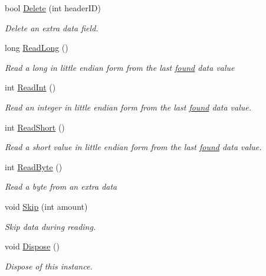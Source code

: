 \begin{DoxyCompactItemize}
bool \hyperlink{class_i_c_sharp_code_1_1_sharp_zip_lib_1_1_zip_1_1_zip_extra_data_a6726b4cecc913a3a09cea0b97e2edf7b}{Delete} (int header\+ID)
\begin{DoxyCompactList}\small\item\em Delete an extra data field. \end{DoxyCompactList}\item 
long \hyperlink{class_i_c_sharp_code_1_1_sharp_zip_lib_1_1_zip_1_1_zip_extra_data_a06f9836c2c567c9f223810d3e2d9b51c}{Read\+Long} ()
\begin{DoxyCompactList}\small\item\em Read a long in little endian form from the last \hyperlink{class_i_c_sharp_code_1_1_sharp_zip_lib_1_1_zip_1_1_zip_extra_data_a91e0c6c1d11967653256ccb161f9818c}{found} data value \end{DoxyCompactList}\item 
int \hyperlink{class_i_c_sharp_code_1_1_sharp_zip_lib_1_1_zip_1_1_zip_extra_data_a77039b5fe5d0c56be598b5eadb669a62}{Read\+Int} ()
\begin{DoxyCompactList}\small\item\em Read an integer in little endian form from the last \hyperlink{class_i_c_sharp_code_1_1_sharp_zip_lib_1_1_zip_1_1_zip_extra_data_a91e0c6c1d11967653256ccb161f9818c}{found} data value. \end{DoxyCompactList}\item 
int \hyperlink{class_i_c_sharp_code_1_1_sharp_zip_lib_1_1_zip_1_1_zip_extra_data_a13e4cefe2f4873f46fc93cc043852e57}{Read\+Short} ()
\begin{DoxyCompactList}\small\item\em Read a short value in little endian form from the last \hyperlink{class_i_c_sharp_code_1_1_sharp_zip_lib_1_1_zip_1_1_zip_extra_data_a91e0c6c1d11967653256ccb161f9818c}{found} data value. \end{DoxyCompactList}\item 
int \hyperlink{class_i_c_sharp_code_1_1_sharp_zip_lib_1_1_zip_1_1_zip_extra_data_ae4b31cc84f7085ace9656c3bff5bd3cc}{Read\+Byte} ()
\begin{DoxyCompactList}\small\item\em Read a byte from an extra data \end{DoxyCompactList}\item 
void \hyperlink{class_i_c_sharp_code_1_1_sharp_zip_lib_1_1_zip_1_1_zip_extra_data_afb83d24996e6234cdd6ed3b03785ec9c}{Skip} (int amount)
\begin{DoxyCompactList}\small\item\em Skip data during reading. \end{DoxyCompactList}\item 
void \hyperlink{class_i_c_sharp_code_1_1_sharp_zip_lib_1_1_zip_1_1_zip_extra_data_a05471c32c736f77ac7855925048988ef}{Dispose} ()
\begin{DoxyCompactList}\small\item\em Dispose of this instance. \end{DoxyCompactList}\end{DoxyCompactItemize}
